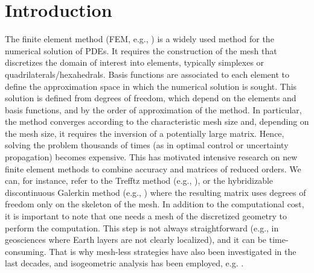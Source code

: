 \section{Introduction%
}\label{sec:introduction}



The finite element method (FEM, e.g., \cite{ciarlet2002finite,Ern2004TheoryAP,brenner2008mathematical})
is a widely used method for the numerical solution of PDEs.
It requires the construction of the mesh that discretizes the domain of interest into elements, typically simplexes or quadrilaterals/hexahedrals.
Basis functions are associated to each element to define the approximation space in which the numerical solution is sought.
This solution is defined from degrees of freedom, which depend on the elements and basis functions, and by the order of approximation
of the method.
In particular, the method converges according to the characteristic mesh size and, depending on the mesh size, it requires the inversion of a potentially large matrix. Hence, solving the problem thousands of times  (as in optimal control or uncertainty propagation) becomes expensive.
This has motivated intensive research on new finite element methods to combine accuracy and matrices of reduced orders.
We can, for instance, refer to the Trefftz method (e.g., \cite{hiptmair2013error,moiola2018space,ImbMoiSto2022}),
or the hybridizable discontinuous Galerkin method (e.g., \cite{Cockburn2008,hungria2017hdg,Pham2024stabilization})
where the resulting matrix uses degrees of freedom only on the skeleton of the mesh.
In addition to the computational cost, it is important to note that one needs a mesh of the discretized geometry to perform the computation.
This step is not always straightforward (e.g., in geosciences where Earth layers are not clearly localized), and it can be time-consuming.
That is why mesh-less strategies have also been investigated in the last decades, and isogeometric analysis has been employed, e.g.
 \cite{hughes2005isogeometric,Frambati2022practical}.


